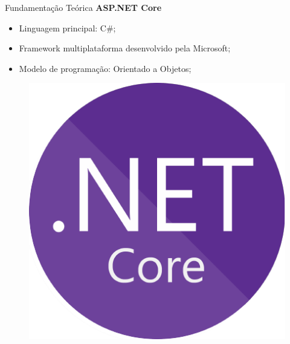 \documentclass{libs/ufc_format}
\begin{document}
\begin{frame}{Fundamentação Teórica}
    \textbf{ASP.NET Core}\nocite{dotnet}\let\thefootnote\relax{}
    \begin{multicols}{2}
        \begin{itemize}
            \item Linguagem principal: C\#;
            \item Framework multiplataforma desenvolvido pela Microsoft;
            \item Modelo de programação: Orientado a Objetos;
        \end{itemize}
        \begin{figure}[H]
            \centering
            \includegraphics[width=0.7\linewidth]{figuras/logo-dotnet.pdf}
            \captionsetup{justification=centering}
            \label{fig:modelo-rest-api}
        \end{figure}
    \end{multicols}
\end{frame}
\end{document}

